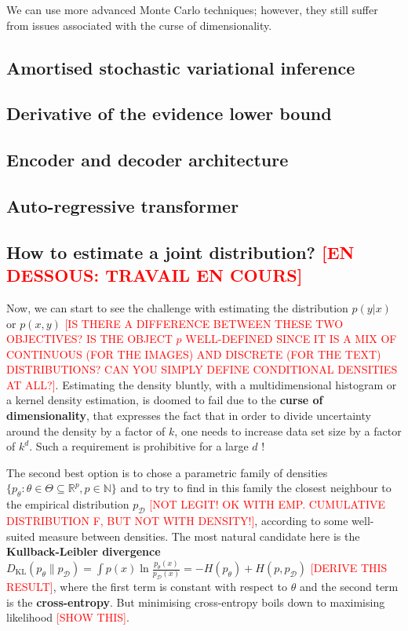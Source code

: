 \documentclass{article}
\begin{document}
\begin{appendix}
{We can use more advanced Monte Carlo techniques; however, they still suffer from issues associated with the curse of dimensionality. 
}

\subsection{Amortised stochastic variational inference}

\subsection{Derivative of the evidence lower bound}

\subsection{Encoder and decoder architecture}

\subsection{Auto-regressive transformer}

\subsection{How to estimate a joint distribution? \textcolor{red}{[EN DESSOUS: TRAVAIL EN COURS]}}
Now, we can start to see the challenge with estimating the distribution $p(y|x)$ or $p(x,y)$ \textcolor{red}{[IS THERE A DIFFERENCE BETWEEN THESE TWO OBJECTIVES? IS THE OBJECT $p$ WELL-DEFINED SINCE IT IS A MIX OF CONTINUOUS (FOR THE IMAGES) AND DISCRETE (FOR THE TEXT) DISTRIBUTIONS? CAN YOU SIMPLY DEFINE CONDITIONAL DENSITIES AT ALL?]}. Estimating the density bluntly, with a multidimensional histogram or a kernel density estimation, is doomed to fail due to the \textbf{curse of dimensionality}, that expresses the fact that in order to divide uncertainty around the density by a factor of $k$, one needs to increase data set size by a factor of $k^d$. Such a requirement is prohibitive for a large $d$ !

The second best option is to chose a parametric family of densities $\{p_\theta{}:\theta \in \Theta \subseteq \mathbb{R}^p, p\in\mathbb{N}\}$ and to try to find in this family the closest neighbour to the empirical distribution $p_{\mathcal{D}}$ \textcolor{red}{[NOT LEGIT! OK WITH EMP. CUMULATIVE DISTRIBUTION F, BUT NOT WITH DENSITY!]}, according to some well-suited measure between densities.
The most natural candidate here is the \textbf{Kullback-Leibler divergence} $D_{\operatorname{KL}}(p_\theta\|p_\mathcal{D})=\int p(x) \ln \frac{p_\theta(x)}{p_\mathcal{D}(x)}=-H(p_\theta)+H(p,p_\mathcal{D})$ \textcolor{red}{[DERIVE THIS RESULT]}, where the first term is constant with respect to $\theta$ and the second term is the \textbf{cross-entropy}.
But minimising cross-entropy boils down to maximising likelihood \textcolor{red}{[SHOW THIS]}.


\end{appendix}
\end{document}
